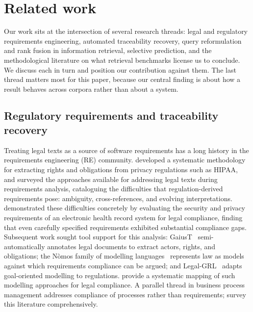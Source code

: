 \documentclass[smallextended,natbib]{svjour3}
\begin{document}
\section{Related work}
\label{sec:related}

Our work sits at the intersection of several research threads: legal and regulatory requirements engineering, automated traceability recovery, query reformulation and rank fusion in information retrieval, selective prediction, and the methodological literature on what retrieval benchmarks license us to conclude.
We discuss each in turn and position our contribution against them.
The last thread matters most for this paper, because our central finding is about how a result behaves across corpora rather than about a system.

\subsection{Regulatory requirements and traceability recovery}
\label{sec:related-legal}

Treating legal texts as a source of software requirements has a long history in the requirements engineering (RE) community.
\citet{Breaux2008} developed a systematic methodology for extracting rights and obligations from privacy regulations such as HIPAA, and \citet{OttoAnton2007} surveyed the approaches available for addressing legal texts during requirements analysis, cataloguing the difficulties that regulation-derived requirements pose: ambiguity, cross-references, and evolving interpretations.
\citet{Massey2010} demonstrated these difficulties concretely by evaluating the security and privacy requirements of an electronic health record system for legal compliance, finding that even carefully specified requirements exhibited substantial compliance gaps.
Subsequent work sought tool support for this analysis: GaiusT~\citep{Zeni2015} semi-automatically annotates legal documents to extract actors, rights, and obligations; the N\`omos family of modelling languages~\citep{Ingolfo2011} represents law as models against which requirements compliance can be argued; and Legal-GRL~\citep{Ghanavati2014} adapts goal-oriented modelling to regulations.
\citet{Akhigbe2019} provide a systematic mapping of such modelling approaches for legal compliance.
A parallel thread in business process management addresses compliance of processes rather than requirements; \citet{Hashmi2018} survey this literature comprehensively.
\end{document}
